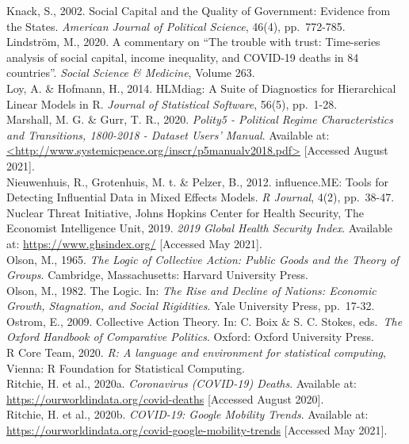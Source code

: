\documentclass[
  12pt,
]{article}
\begin{document}
Knack, S., 2002. Social Capital and the Quality of Government: Evidence from the States. \emph{American Journal of Political Science}, 46(4), pp.~772-785.\\
Lindström, M., 2020. A commentary on ``The trouble with trust: Time-series analysis of social capital, income inequality, and COVID-19 deaths in 84 countries''. \emph{Social Science \& Medicine}, Volume 263.\\
Loy, A. \& Hofmann, H., 2014. HLMdiag: A Suite of Diagnostics for Hierarchical Linear Models in R. \emph{Journal of Statistical Software}, 56(5), pp.~1-28.\\
Marshall, M. G. \& Gurr, T. R., 2020. \emph{Polity5 - Political Regime Characteristics and Transitions, 1800-2018 - Dataset Users' Manual}. Available at: \href{http://www.systemicpeace.org/inscr/p5manualv2018.pdf}{\textless http://www.systemicpeace.org/inscr/p5manualv2018.pdf\textgreater{}} {[}Accessed August 2021{]}.\\
Nieuwenhuis, R., Grotenhuis, M. t. \& Pelzer, B., 2012. influence.ME: Tools for Detecting Influential Data in Mixed Effects Models. \emph{R Journal}, 4(2), pp.~38-47.\\
Nuclear Threat Initiative, Johns Hopkins Center for Health Security, The Economist Intelligence Unit, 2019. \emph{2019 Global Health Security Index}. Available at: \url{https://www.ghsindex.org/} {[}Accessed May 2021{]}.\\
Olson, M., 1965. \emph{The Logic of Collective Action: Public Goods and the Theory of Groups}. Cambridge, Massachusetts: Harvard University Press.\\
Olson, M., 1982. The Logic. In: \emph{The Rise and Decline of Nations: Economic Growth, Stagnation, and Social Rigidities}. Yale University Press, pp.~17-32.\\
Ostrom, E., 2009. Collective Action Theory. In: C. Boix \& S. C. Stokes, eds.~\emph{The Oxford Handbook of Comparative Politics}. Oxford: Oxford University Press.\\
R Core Team, 2020. \emph{R: A language and environment for statistical computing}, Vienna: R Foundation for Statistical Computing.\\
Ritchie, H. et al., 2020a. \emph{Coronavirus (COVID-19) Deaths}. Available at: \url{https://ourworldindata.org/covid-deaths} {[}Accessed August 2020{]}.\\
Ritchie, H. et al., 2020b. \emph{COVID-19: Google Mobility Trends}. Available at: \url{https://ourworldindata.org/covid-google-mobility-trends} {[}Accessed May 2021{]}.\\
\end{document}
